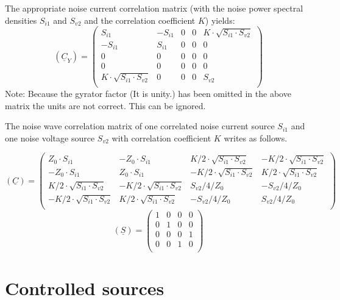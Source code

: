 The appropriate noise current correlation matrix (with the noise
power spectral densities $S_{i1}$ and $S_{v2}$ and the
correlation coefficient $K$) yields:
\begin{equation}
(\underline{C}_Y) =
\begin{pmatrix}
 S_{i1} & -S_{i1} & 0 & 0 & K\cdot\sqrt{S_{i1}\cdot S_{v2}}\\
-S_{i1} & S_{i1} & 0 & 0 & 0\\
 0 & 0 & 0 & 0 & 0\\
 0 & 0 & 0 & 0 & 0\\
 K\cdot\sqrt{S_{i1}\cdot S_{v2}} & 0 & 0 & 0 & S_{v2}\\
\end{pmatrix}
\end{equation}
Note: Because the gyrator factor (It is unity.) has been omitted
in the above matrix the units are not correct. This can be ignored.

\addvspace{12pt}

The noise wave correlation matrix of one correlated noise current
source $S_{i1}$ and one noise voltage source $S_{v2}$ with
correlation coefficient $K$ writes as follows.

\begin{equation}
(\underline{C}) =
\begin{pmatrix}
 Z_0\cdot S_{i1} & -Z_0\cdot S_{i1} &  K/2\cdot\sqrt{S_{i1}\cdot S_{v2}} & -K/2\cdot\sqrt{S_{i1}\cdot S_{v2}} \\
-Z_0\cdot S_{i1} &  Z_0\cdot S_{i1} & -K/2\cdot\sqrt{S_{i1}\cdot S_{v2}} &  K/2\cdot\sqrt{S_{i1}\cdot S_{v2}} \\
 K/2\cdot\sqrt{S_{i1}\cdot S_{v2}} & -K/2\cdot\sqrt{S_{i1}\cdot S_{v2}} &  S_{v2}/4/Z_0 & -S_{v2}/4/Z_0 \\
-K/2\cdot\sqrt{S_{i1}\cdot S_{v2}} &  K/2\cdot\sqrt{S_{i1}\cdot S_{v2}} & -S_{v2}/4/Z_0 &  S_{v2}/4/Z_0 \\
\end{pmatrix}
\end{equation}
\begin{equation}
(\underline{S}) =
\begin{pmatrix}
 1 & 0 & 0 & 0 \\
 0 & 1 & 0 & 0 \\
 0 & 0 & 0 & 1 \\
 0 & 0 & 1 & 0 \\
\end{pmatrix}
\end{equation}


\section{Controlled sources}

